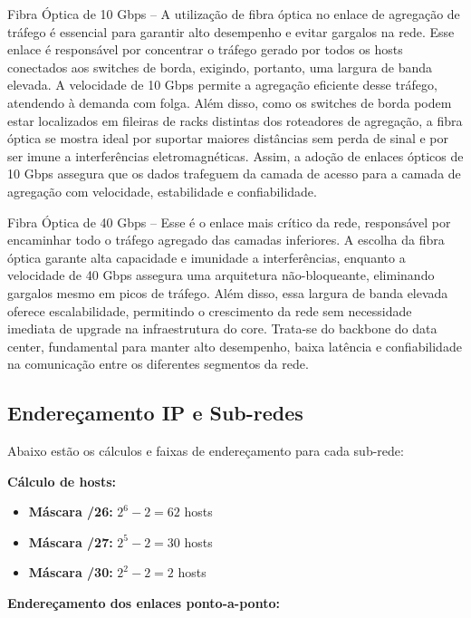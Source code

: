 \documentclass[conference,compsoc]{IEEEtran}
\begin{document}
\begin{otherlanguage}{brazil}
Fibra Óptica de 10 Gbps – A utilização de fibra óptica no enlace de agregação de tráfego é essencial para garantir alto desempenho e evitar gargalos na rede. Esse enlace é responsável por concentrar o tráfego gerado por todos os hosts conectados aos switches de borda, exigindo, portanto, uma largura de banda elevada. A velocidade de 10 Gbps permite a agregação eficiente desse tráfego, atendendo à demanda com folga. Além disso, como os switches de borda podem estar localizados em fileiras de racks distintas dos roteadores de agregação, a fibra óptica se mostra ideal por suportar maiores distâncias sem perda de sinal e por ser imune a interferências eletromagnéticas. Assim, a adoção de enlaces ópticos de 10 Gbps assegura que os dados trafeguem da camada de acesso para a camada de agregação com velocidade, estabilidade e confiabilidade.

Fibra Óptica de 40 Gbps – Esse é o enlace mais crítico da rede, responsável por encaminhar todo o tráfego agregado das camadas inferiores. A escolha da fibra óptica garante alta capacidade e imunidade a interferências, enquanto a velocidade de 40 Gbps assegura uma arquitetura não-bloqueante, eliminando gargalos mesmo em picos de tráfego. Além disso, essa largura de banda elevada oferece escalabilidade, permitindo o crescimento da rede sem necessidade imediata de upgrade na infraestrutura do core. Trata-se do backbone do data center, fundamental para manter alto desempenho, baixa latência e confiabilidade na comunicação entre os diferentes segmentos da rede.

\subsection{Endereçamento IP e Sub-redes}

Abaixo estão os cálculos e faixas de endereçamento para cada sub-rede:

\textbf{Cálculo de hosts:}

\begin{itemize}
    \item \textbf{Máscara /26:} $2^6 - 2 = 62$ hosts
    \item \textbf{Máscara /27:} $2^5 - 2 = 30$ hosts
    \item \textbf{Máscara /30:} $2^2 - 2 = 2$ hosts
\end{itemize}

\textbf{Endereçamento dos enlaces ponto-a-ponto:}


\end{otherlanguage}
\end{document}
